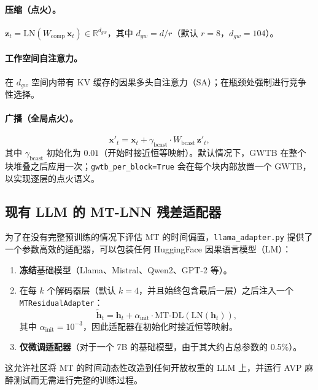 \documentclass[11pt]{article}
\theoremstyle{definition}
\newcommand{\RR}{\mathbb{R}}
\newcommand{\vh}{\mathbf{h}}
\newcommand{\vx}{\mathbf{x}}
\begin{document}
\paragraph{压缩（点火）。}
$\mathbf{z}_t = \mathrm{LN}(W_\text{comp}\,\vx_t)\in\RR^{d_{gw}}$，其中 $d_{gw}=d/r$（默认 $r=8$，$d_{gw}=104$）。

\paragraph{工作空间自注意力。}
在 $d_{gw}$ 空间内带有 KV 缓存的因果多头自注意力（SA）；在瓶颈处强制进行竞争性选择。

\paragraph{广播（全局点火）。}
\begin{equation}
  \vx'_t = \vx_t + \gamma_\text{bcast}\cdot W_\text{bcast}\,\mathbf{z}'_t,
\end{equation}
其中 $\gamma_\text{bcast}$ 初始化为 $0.01$（开始时接近恒等映射）。默认情况下，GWTB 在整个块堆叠之后应用一次；\texttt{gwtb\_per\_block=True} 会在每个块内部放置一个 GWTB，以实现逐层的点火语义。

\subsection{现有 LLM 的 MT-LNN 残差适配器}
\label{sec:adapter}

为了在没有完整预训练的情况下评估 MT 的时间偏置，\texttt{llama\_adapter.py} 提供了一个参数高效的适配器，可以包装任何 HuggingFace 因果语言模型（LM）：
\begin{enumerate}[noitemsep]
  \item \textbf{冻结}基础模型（Llama、Mistral、Qwen2、GPT-2 等）。
  \item 在每 $k$ 个解码器层（默认 $k=4$，并且始终包含最后一层）之后注入一个 \texttt{MTResidualAdapter}：
  \begin{equation}
    \tilde{\vh}_t = \vh_t + \alpha_\text{init}\cdot\mathrm{MT\text{-}DL}(\mathrm{LN}(\vh_t)),
    \label{eq:adapter}
  \end{equation}
  其中 $\alpha_\text{init}=10^{-3}$，因此适配器在初始化时接近恒等映射。
  \item \textbf{仅微调适配器}（对于一个 7B 的基础模型，由于其大约占总参数的 0.5\%）。
\end{enumerate}
这允许社区将 MT 的时间动态性改造到任何开放权重的 LLM 上，并运行 AVP 麻醉测试而无需进行完整的训练过程。
\end{document}
